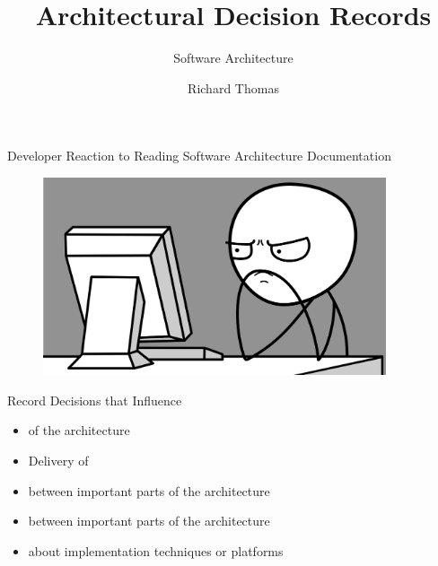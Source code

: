 \documentclass{slide}
\title{Architectural Decision Records}
\subtitle{Software Architecture}
\author{Richard Thomas}
\date{\week{2}}
\begin{document}
\maketitle


\begin{frame}{Developer Reaction to Reading Software Architecture Documentation}

\begin{figure}
    \href{https://pixabay.com/vectors/computer-internet-unhappy-user-1295358/}{\includegraphics[width=0.9\textwidth]{images/frustration.png}}
\end{figure}

\end{frame}


{}


\begin{frame}{Record Decisions that Influence}

\Large{
\begin{itemize}
    \item {} of the architecture
    \item Delivery of 
    \item {} between important parts of the architecture
	\vspace{1mm}
    \item {} between important parts of the architecture
    \item {} about implementation techniques or platforms
\end{itemize}
}

\end{frame}
\end{document}
